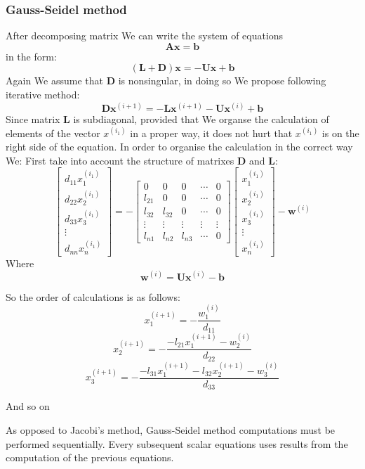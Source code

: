 \documentclass[12pt]{report}
\begin{document}
\subsubsection{Gauss-Seidel method}
After decomposing matrix We can write the system of equations
\[ \mathbf{A}\mathbf{x} = \mathbf{b} \]
in the form:
\[ (\mathbf{L}+\mathbf{D})\mathbf{x} = -\mathbf{U}\mathbf{x}+\mathbf{b}
\]
Again We assume that \textbf{D} is nonsingular, in doing so We propose following iterative method:
\[ \mathbf{D}\mathbf{x}^{(i+1)} = -\mathbf{L}\mathbf{x}^{(i+1)}-\mathbf{U}\mathbf{x}^{(i)}+\mathbf{b}
\]
Since matrix \textbf{L} is subdiagonal, provided that We organse the calculation of elements of the vector $x^{(i_1)}$ in a proper way, it does not hurt that $x^{(i_1)}$ is on the right side of the equation.
In order to organise the calculation in the correct way We:
First take into account the structure of matrixes \textbf{D} and \textbf{L}:
\[
\begin{bmatrix}
d_{11}x_1^{(i_1)}\\
d_{22}x_2^{(i_1)}\\
d_{33}x_3^{(i_1)}\\
\vdots\\
d_{nn}x_n^{(i_1)}
\end{bmatrix}
=
-
\begin{bmatrix}
0 & 0 & 0 & \cdots & 0\\
l_{21} & 0 & 0 & \cdots & 0\\
l_{32} & l_{32} & 0 & \cdots & 0\\
\vdots & \vdots & \vdots & \vdots & \vdots\\
l_{n1} & l_{n2} & l_{n3} & \cdots & 0
\end{bmatrix}
\begin{bmatrix}
x_1^{(i_1)}\\
x_2^{(i_1)}\\
x_3^{(i_1)}\\
\vdots\\
x_n^{(i_1)}
\end{bmatrix}
-
\mathbf{w}^{(i)}
\]
Where
\[ \mathbf{w}^{(i)} = \mathbf{U}\mathbf{x}^{(i)} - \mathbf{b} \]

\newpage
So the order of calculations is as follows:
\[ x_1^{(i+1)} = -\frac{w_1^{(i)}}{d_{11}} \]
\[ x_2^{(i+1)} = -\frac{-l_{21}x_1^{(i+1)} - w_2^{(i)}}{d_{22}} \]
\[ x_3^{(i+1)} = -\frac{-l_{31}x_1^{(i+1)} -l_{32}x_2^{(i+1)} - w_3^{(i)}}{d_{33}} \]

And so on

As opposed to Jacobi's method, Gauss-Seidel method computations must be performed sequentially. Every subsequent scalar equations uses results from the computation of the previous equations.
\end{document}
